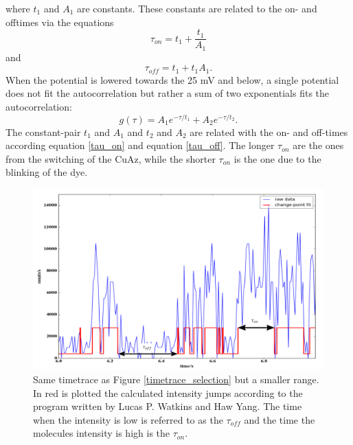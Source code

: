 \documentclass[twoside,single]{lion-msc}
\begin{document}
where $t_{1}$ and $A_{1}$ are constants. These constants are related to the on- and offtimes via the equations
\begin{equation}\label{tau_on}
\tau_{on} = t_{1} +\frac{t_{1}}{A_{1}}
\end{equation}
and
\begin{equation}\label{tau_off}
\tau_{off} = t_{1} +t_{1}A_{1}.
\end{equation}
When the potential is lowered towards the 25 mV and below, a single potential does not fit the autocorrelation but rather a sum of two exponentials fits the autocorrelation: 
\begin{equation}\label{multi_exp}
g(\tau) = A_{1}e^{-\tau/t_{1}} + A_{2}e^{-\tau/t_{2}}. 
\end{equation}
The constant-pair $t_{1}$ and $A_{1}$ and $t_{2}$ and $A_{2}$ are related with the on- and off-times according equation \ref{tau_on} and equation \ref{tau_off}. The longer $\tau_{on}$ are the ones from the switching of the CuAz, while the shorter $\tau_{on}$ is the one due to the blinking of the dye.


\begin{figure}[ht!]
\centering
\includegraphics[width=\textwidth]{on_off_test1}
\caption{Same timetrace as Figure \ref{timetrace_selection} but a smaller range. In red is plotted the calculated intensity jumps according to the program written by Lucas P. Watkins and Haw Yang. The time when the intensity is low is referred to as the $\tau_{off}$ and the time the molecules intensity is high is the $\tau_{on}$.}
\label{on_off_times}
\end{figure}
\end{document}
